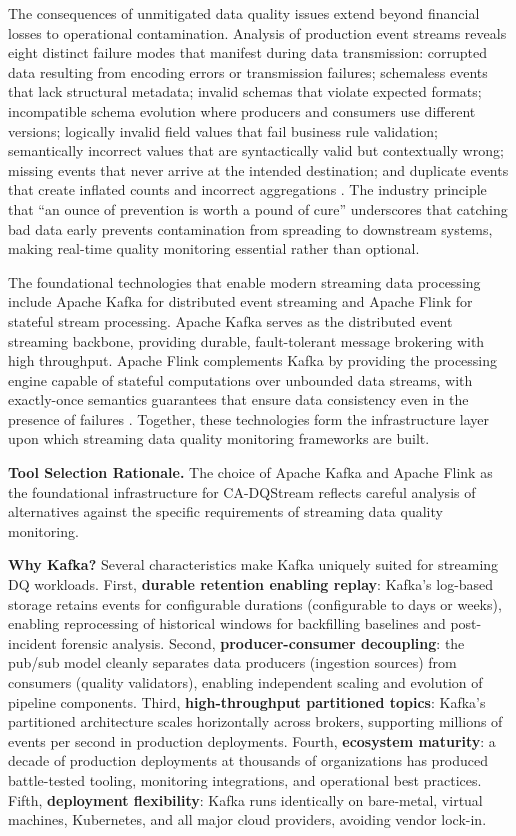 The consequences of unmitigated data quality issues extend beyond financial losses to operational contamination. Analysis of production event streams reveals eight distinct failure modes that manifest during data transmission: corrupted data resulting from encoding errors or transmission failures; schemaless events that lack structural metadata; invalid schemas that violate expected formats; incompatible schema evolution where producers and consumers use different versions; logically invalid field values that fail business rule validation; semantically incorrect values that are syntactically valid but contextually wrong; missing events that never arrive at the intended destination; and duplicate events that create inflated counts and incorrect aggregations \citep{confluent_2025}. The industry principle that ``an ounce of prevention is worth a pound of cure'' underscores that catching bad data early prevents contamination from spreading to downstream systems, making real-time quality monitoring essential rather than optional.

The foundational technologies that enable modern streaming data processing include Apache Kafka for distributed event streaming and Apache Flink for stateful stream processing. Apache Kafka serves as the distributed event streaming backbone, providing durable, fault-tolerant message brokering with high throughput. Apache Flink complements Kafka by providing the processing engine capable of stateful computations over unbounded data streams, with exactly-once semantics guarantees that ensure data consistency even in the presence of failures \citep{kafkaintro2024, flinkdocs2024}. Together, these technologies form the infrastructure layer upon which streaming data quality monitoring frameworks are built.

\textbf{Tool Selection Rationale.} The choice of Apache Kafka and Apache Flink as the foundational infrastructure for CA-DQStream reflects careful analysis of alternatives against the specific requirements of streaming data quality monitoring.

\textbf{Why Kafka?} Several characteristics make Kafka uniquely suited for streaming DQ workloads. First, \textbf{durable retention enabling replay}: Kafka's log-based storage retains events for configurable durations (configurable to days or weeks), enabling reprocessing of historical windows for backfilling baselines and post-incident forensic analysis. Second, \textbf{producer-consumer decoupling}: the pub/sub model cleanly separates data producers (ingestion sources) from consumers (quality validators), enabling independent scaling and evolution of pipeline components. Third, \textbf{high-throughput partitioned topics}: Kafka's partitioned architecture scales horizontally across brokers, supporting millions of events per second in production deployments. Fourth, \textbf{ecosystem maturity}: a decade of production deployments at thousands of organizations has produced battle-tested tooling, monitoring integrations, and operational best practices. Fifth, \textbf{deployment flexibility}: Kafka runs identically on bare-metal, virtual machines, Kubernetes, and all major cloud providers, avoiding vendor lock-in.

